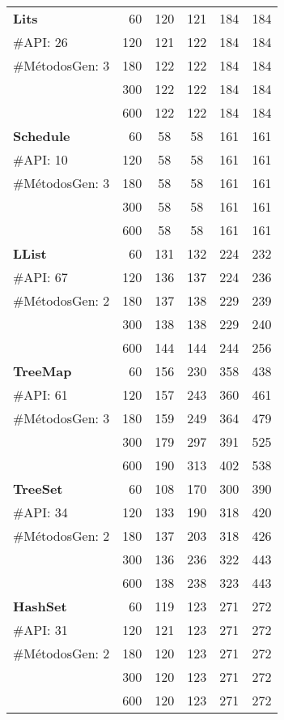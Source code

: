 \begin{table}[H]
{\begin{tabular}{l |r |cc |cc }
\multirow{1}{*}{\textbf{Lits}} 
  & 60 &120 &121 & 184 &184  \\
  {\scriptsize \#API: 26}&120 & 121&122  & 184&184 \\
  {\scriptsize \#MétodosGen: 3}&180 & 122& 122 & 184& 184 \\
  & 300& 122& 122 & 184& 184  \\
& 600 & 122& 122 & 184& 184  \\



\hline
\multirow{1}{*}{\textbf{Schedule}} 
  & 60 & 58&58 & 161&161 \\
  {\scriptsize \#API: 10}&120 & 58&58 & 161&161  \\
  {\scriptsize \#MétodosGen: 3}&180 & 58 &58  &161& 161 \\
  & 300 & 58 &58  &161& 161   \\
  & 600 & 58 &58  &161& 161 \\

\hline

\multirow{1}{*}{\textbf{LList}} 
& 60 & 131  & 132  & 224 & 232 \\
  {\scriptsize \#API: 67}& 120 &136  & 137 & 224 &236 \\
  {\scriptsize \#MétodosGen: 2}& 180 & 137& 138 &  229& 239  \\
    & 300 & 138 & 138 &229 &  240 \\
  & 600 & 144 &  144 & 244&  256\\
\hline

 \multirow{1}{*}{\textbf{TreeMap}} 
 & 60 & 156 & 230   & 358 & 438\\
  {\scriptsize \#API: 61  }& 120 & 157 & 243&  360& 461 \\
  {\scriptsize \#MétodosGen: 3}& 180 & 159 & 249 & 364 &479 \\
    & 300 & 179 & 297 & 391&  525 \\
  & 600 &  190&  313 & 402& 538 \\
\hline
 \multirow{1}{*}{\textbf{TreeSet}} 
  & 60 & 108 & 170 & 300 &390  \\
  {\scriptsize \#API: 34}& 120 & 133 & 190 & 318 & 420  \\
  {\scriptsize \#MétodosGen: 2}& 180 & 137 &  203 & 318 & 426  \\
    & 300 & 136 & 236 & 322&  443 \\
  & 600 & 138 & 238  & 323&  443\\
 \hline


 \multirow{1}{*}{\textbf{HashSet}} 
 & 60  &  119 &123 &271 &  272 \\
  {\scriptsize \#API: 31}& 120 & 121 &123 & 271 & 272 \\
  {\scriptsize \#MétodosGen: 2}& 180 & 120 & 123 &271  & 272 \\
    & 300 & 120 & 123 &271 &272   \\
  & 600 & 120 & 123 & 271& 272 \\
 

\end{tabular}}
\end{table}
